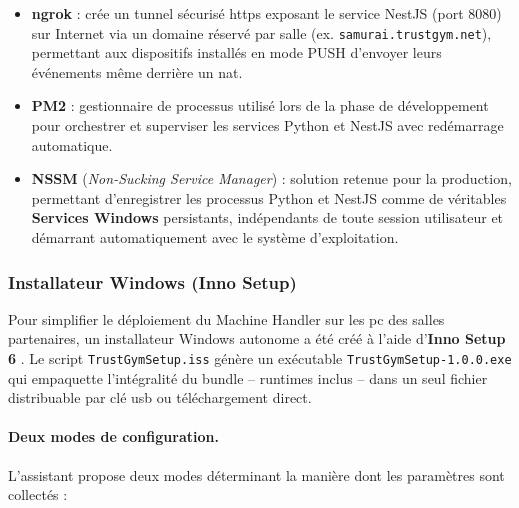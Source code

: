 ﻿\documentclass[../main.tex]{subfiles}
\begin{document}
\begin{itemize}
  \item \textbf{ngrok} \cite{ngrok} : cr\'{e}e un tunnel s\'{e}curis\'{e} \acrshort{https} exposant le service NestJS (port 8080) sur Internet via un domaine r\'{e}serv\'{e} par salle (ex. \texttt{samurai.trustgym.net}), permettant aux dispositifs install\'{e}s en mode PUSH d'envoyer leurs \'{e}v\'{e}nements m\^{e}me derri\`{e}re un \acrshort{nat}.
  \item \textbf{PM2} \cite{pm2} : gestionnaire de processus utilis\'{e} lors de la phase de d\'{e}veloppement pour orchestrer et superviser les services Python et NestJS avec red\'{e}marrage automatique.
  \item \textbf{NSSM} \cite{nssm} (\textit{Non-Sucking Service Manager}) : solution retenue pour la production, permettant d'enregistrer les processus Python et NestJS comme de v\'{e}ritables \textbf{Services Windows} persistants, ind\'{e}pendants de toute session utilisateur et d\'{e}marrant automatiquement avec le syst\`{e}me d'exploitation.
\end{itemize}

\subsubsection{Installateur Windows (Inno Setup)}

\begin{sloppypar}
Pour simplifier le d\'{e}ploiement du Machine Handler sur les \acrshort{pc} des salles partenaires, un installateur Windows autonome a \'{e}t\'{e} cr\'{e}\'{e} \`{a} l'aide d'\textbf{Inno Setup 6} \cite{innosetup}. Le script \texttt{TrustGymSetup.iss} g\'{e}n\`{e}re un ex\'{e}cutable \texttt{TrustGymSetup-1.0.0.exe} qui empaquette l'int\'{e}gralit\'{e} du bundle -- runtimes inclus -- dans un seul fichier distribuable par cl\'{e} \acrshort{usb} ou t\'{e}l\'{e}chargement direct.
\end{sloppypar}

\paragraph{Deux modes de configuration.}
L'assistant propose deux modes d\'{e}terminant la mani\`{e}re dont les param\`{e}tres sont collect\'{e}s :
\end{document}

